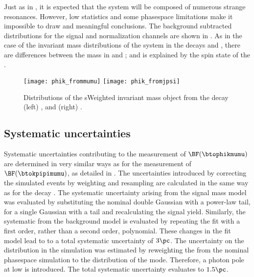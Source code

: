 Just as in \kpipi, it is expected that the \phik system will be composed of numerous strange
resonances.
However, low statistics and some phasespace limitations make it impossible to draw and meaningful
conclusions.
The background subtracted \phik distributions for the signal and normalization channels are shown
in .
As in the case of the invariant mass distributions of the \kpipi system in the decays \btokpipimumu
and \btojpsikpipi, there are differences between the \phik mass in \btophikmumu and \btojpsiphik;
and is explained by the spin state of the \jpsi.

\begin{figure}
  \begin{center}
    \texttt{[image: phik\_frommumu]}
    \texttt{[image: phik\_fromjpsi]}
    \caption[Invariant mass distributions of \phik]
    {
      Distributions of the sWeighted invariant mass \phik object from the decay
      (left) \btophikmumu, and
      (right) \btojpsiphik.
    }
    \label{fig:phik:phik}
  \end{center}
\end{figure}






\subsection{Systematic uncertainties}
\label{ssec:phik:syst}

Systematic uncertainties contributing to the measurement of $\BF(\btophikmumu)$ are determined in
very similar ways as for the measurement of $\BF(\btokpipimumu)$, as detailed in
.
The uncertainties introduced by correcting the simulated events by weighting and resampling are
calculated in the same way as for the decay \btokpipimumu.
The systematic uncertainty arising from the signal mass model was evaluated by
substituting the nominal double Gaussian with a power-law tail, for a single Gaussian with a tail
and recalculating the signal yield.
Similarly, the systematic from the background model is evaluated by repeating the fit with a first
order, rather than a second order, polynomial.
These changes in the fit model lead to to a total systematic uncertainty of \approx$3\pc$.
The uncertainty on the \qsq distribution in the simulation was estimated by reweighting the from
the nominal phasespace simulation to the distribution of the  mode.
Therefore, a photon pole at low \qsq is introduced.
The total systematic uncertainty evaluates to \approx$1.5\pc$.

